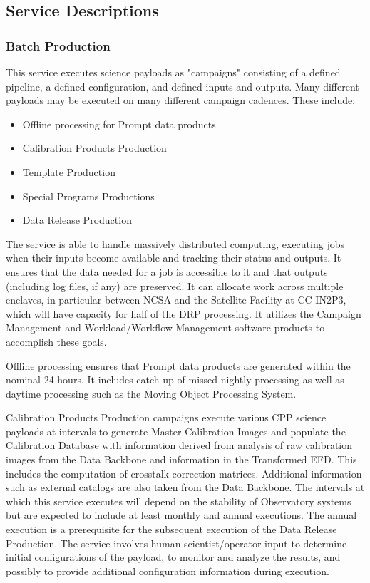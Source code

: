 \documentclass[DM,toc]{lsstdoc}
\begin{document}
\subsection{Service Descriptions}\label{ncsa-gen-prod-service-descriptions}

\subsubsection{Batch Production}\label{batch-production}

This service executes science payloads as "campaigns" consisting of a defined pipeline, a defined configuration, and defined inputs and outputs.
Many different payloads may be executed on many different campaign cadences.
These include:
\begin{itemize}
	\item Offline processing for Prompt data products
	\item Calibration Products Production
	\item Template Production
	\item Special Programs Productions
	\item Data Release Production
\end{itemize}

The service is able to handle massively distributed computing, executing jobs when their inputs become available and tracking their status and outputs.
It ensures that the data needed for a job is accessible to it and that outputs (including log files, if any) are preserved.
It can allocate work across multiple enclaves, in particular between NCSA and the Satellite Facility at CC-IN2P3, which will have capacity for half of the DRP processing.
It utilizes the Campaign Management and Workload/Workflow Management software products to accomplish these goals.

Offline processing ensures that Prompt data products are generated within the nominal 24 hours.
It includes catch-up of missed nightly processing as well as daytime processing such as the Moving Object Processing System.

Calibration Products Production campaigns execute various CPP science payloads at intervals to
generate Master Calibration Images and populate the Calibration Database
with information derived from analysis of raw calibration images from
the Data Backbone and information in the Transformed EFD. This includes
the computation of crosstalk correction matrices.
Additional information such as external catalogs are also
taken from the Data Backbone. The intervals at which this service
executes will depend on the stability of Observatory systems but are
expected to include at least monthly and annual executions. The annual
execution is a prerequisite for the subsequent execution of the Data
Release Production. The service involves human scientist/operator input
to determine initial configurations of the payload, to monitor and
analyze the results, and possibly to provide additional configuration
information during execution.
\end{document}
